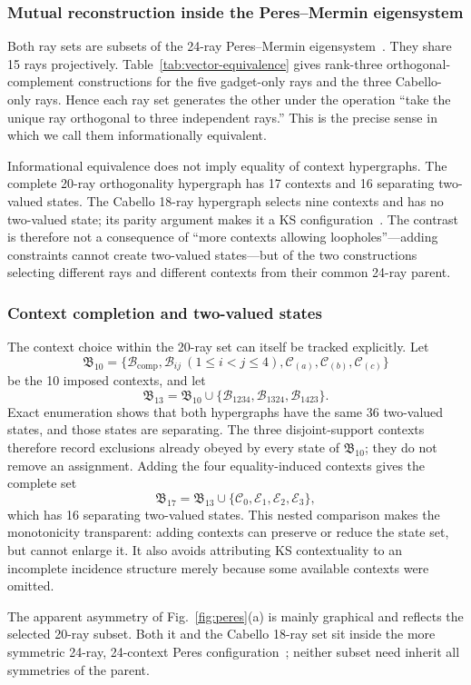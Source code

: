 \documentclass[%
  reprint,
  superscriptaddress,
  showpacs,
  showkeys,
  amsmath,amssymb,
  pra,
  longbibliography,
  floatfix,
  x11names
]{revtex4-2}
\newenvironment{revision}{\begingroup\color{revisionblue}}{\endgroup}
\begin{document}
\begin{revision}
\subsubsection{Mutual reconstruction inside the Peres--Mermin eigensystem}

Both ray sets are subsets of the 24-ray Peres--Mermin eigensystem~\cite{pavicic-2004ksafq,svozil-2024-convert-pra-externalfigures}.  They share 15 rays projectively.  Table~\ref{tab:vector-equivalence} gives rank-three orthogonal-complement constructions for the five gadget-only rays and the three Cabello-only rays.  Hence each ray set generates the other under the operation ``take the unique ray orthogonal to three independent rays.''  This is the precise sense in which we call them informationally equivalent.

Informational equivalence does not imply equality of context hypergraphs.  The complete 20-ray orthogonality hypergraph has 17 contexts and 16 separating two-valued states.  The Cabello 18-ray hypergraph selects nine contexts and has no two-valued state; its parity argument makes it a KS configuration~\cite{cabello-96}.  The contrast is therefore not a consequence of ``more contexts allowing loopholes''---adding constraints cannot create two-valued states---but of the two constructions selecting different rays and different contexts from their common 24-ray parent.

\subsubsection{Context completion and two-valued states}

The context choice within the 20-ray set can itself be tracked explicitly.  Let
\[
\mathfrak{B}_{10}=\{\mathcal{B}_{\mathrm{comp}},\mathcal{B}_{ij}\ (1\leq i<j\leq4),
\mathcal{C}_{(a)},\mathcal{C}_{(b)},\mathcal{C}_{(c)}\}
\]
be the 10 imposed contexts, and let
\[
\mathfrak{B}_{13}=\mathfrak{B}_{10}\cup
\{\mathcal{B}_{1234},\mathcal{B}_{1324},\mathcal{B}_{1423}\}.
\]
Exact enumeration shows that both hypergraphs have the same 36 two-valued states, and those states are separating.  The three disjoint-support contexts therefore record exclusions already obeyed by every state of $\mathfrak{B}_{10}$; they do not remove an assignment.  Adding the four equality-induced contexts gives the complete set
\[
\mathfrak{B}_{17}=\mathfrak{B}_{13}\cup\{\mathcal{C}_0,\mathcal{E}_1,\mathcal{E}_2,\mathcal{E}_3\},
\]
which has 16 separating two-valued states.  This nested comparison makes the monotonicity transparent: adding contexts can preserve or reduce the state set, but cannot enlarge it.  It also avoids attributing KS contextuality to an incomplete incidence structure merely because some available contexts were omitted.

The apparent asymmetry of Fig.~\ref{fig:peres}(a) is mainly graphical and reflects the selected 20-ray subset.  Both it and the Cabello 18-ray set sit inside the more symmetric 24-ray, 24-context Peres configuration~\cite{Pavicic-2005,pavicic-2005csvcorri}; neither subset need inherit all symmetries of the parent.
\end{revision}
\end{document}

